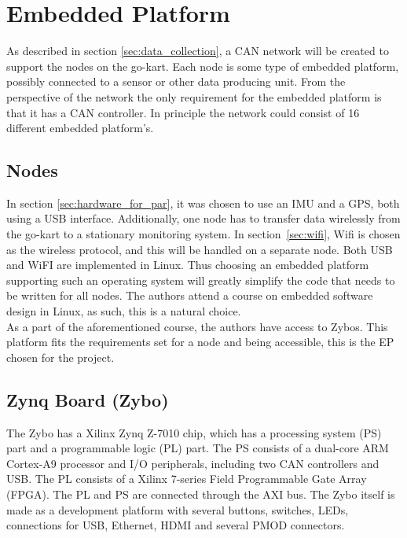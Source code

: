 
\section{Embedded Platform}\label{sec:EP}
As described in section \ref{sec:data_collection}, a CAN network will be created to support the nodes on the go-kart.
Each node is some type of embedded platform, possibly connected to a sensor or other data producing unit.
From the perspective of the network the only requirement for the embedded platform is that it has a CAN controller.
In principle the network could consist of 16 different embedded platform's.
\subsection{Nodes}
In section \ref{sec:hardware_for_par}, it was chosen to use an IMU and a GPS, both using a USB interface.
Additionally, one node has to transfer data wirelessly from the go-kart to a stationary monitoring system.
In section~\ref{sec:wifi}, Wifi is chosen as the wireless protocol, and this will be handled on a separate node.
Both USB and WiFI are implemented in Linux.
Thus choosing an embedded platform supporting such an operating system will greatly simplify the code that needs to be written for all nodes.
The authors attend a course on embedded software design in Linux, as such, this is a natural choice.\\

As a part of the aforementioned course, the authors have access to Zybos.
This platform fits the requirements set for a node and being accessible, this is the EP chosen for the project.

\subsection{Zynq Board (Zybo)}
The Zybo has a Xilinx Zynq Z-7010 chip, which has a processing system (PS) part and a programmable logic (PL) part.
The PS consists of a dual-core ARM Cortex-A9 processor and I/O peripherals, including two CAN controllers and USB.
The PL consists of a Xilinx 7-series Field Programmable Gate Array (FPGA). 
The PL and PS are connected through the AXI bus.
The Zybo itself is made as a development platform with several buttons, switches, LEDs, connections for USB, Ethernet, HDMI and several PMOD connectors.
